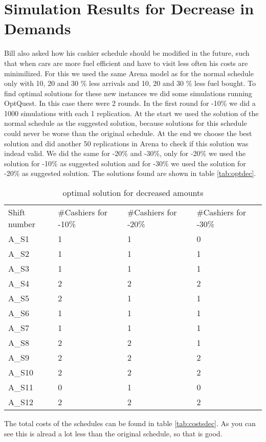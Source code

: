 \section{Simulation Results for Decrease in Demands}\label{app:demands}
Bill also asked how his cashier schedule should be modified in the future, such that when cars are more fuel efficient and have to visit less often his costs are minimilized. 
For this we used the same Arena model as for the normal schedule only with 10, 20 and 30 \% less arrivals and 10, 20 and 30 \% less fuel bought. 
To find optimal solutions for these new instances we did some simulations running OptQuest. 
In this case there were 2 rounds.
In the first round for -10\% we did a 1000 simulations with each 1 replication. 
At the start we used the solution of the normal schedule as the suggested solution, because solutions for this schedule could never be worse than the original schedule.
At the end we choose the best solution and did another 50 replications in Arena to check if this solution was indead valid. 
We did the same for -20\% and -30\%, only for -20\% we used the solution for -10\% as suggested solution and for -30\% we used the solution for -20\% as suggested solution.
The solutions found are shown in table \autoref{tab:optdec}.

\begin{table}[h!]
	\centering
	\begin{tabular}{l | l | l | l |}
		Shift number & \#Cashiers for -10\% & \#Cashiers for -20\% & \#Cashiers for -30\% \\
		A\_S1 & 1  & 1 & 0\\
		A\_S2 & 1  & 1 & 1\\
		A\_S3 & 1  & 1 & 1\\
		A\_S4 & 2  & 2 & 2\\
		A\_S5 & 2  & 1 & 1\\
		A\_S6 & 1  & 1 & 1\\
		A\_S7 & 1  & 1 & 1\\
		A\_S8 & 2  & 2 & 1\\
		A\_S9 & 2  & 2 & 2\\
		A\_S10 & 2  & 2 & 2\\
		A\_S11 & 0  & 1 & 0\\
		A\_S12 & 2  & 2 & 2\\
	\end{tabular}
	\caption{optimal solution for decreased amounts}
	\label{tab:optdec}
\end{table}

The total costs of the schedules can be found in table \autoref{tab:costsdec}. As you can see this is alread a lot less than the original schedule, so that is good.

